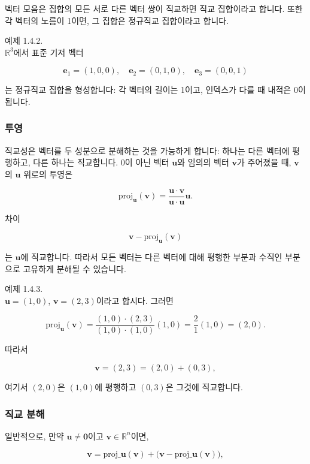 \documentclass[
  12pt,
  a4paper,
]{article}
\begin{document}
벡터 모음은 집합의 모든 서로 다른 벡터 쌍이 직교하면 직교 집합이라고 합니다. 또한 각 벡터의 노름이 1이면, 그 집합은 정규직교 집합이라고 합니다.

예제 1.4.2.\\
\(\mathbb{R}^3\)에서 표준 기저 벡터

\[\mathbf{e}_1 = (1,0,0), \quad \mathbf{e}_2 = (0,1,0), \quad \mathbf{e}_3 = (0,0,1)\]

는 정규직교 집합을 형성합니다: 각 벡터의 길이는 1이고, 인덱스가 다를 때 내적은 0이 됩니다.

\subsubsection{투영}\label{projections}

직교성은 벡터를 두 성분으로 분해하는 것을 가능하게 합니다: 하나는 다른 벡터에 평행하고, 다른 하나는 직교합니다. 0이 아닌 벡터 \(\mathbf{u}\)와 임의의 벡터 \(\mathbf{v}\)가 주어졌을 때, \(\mathbf{v}\)의 \(\mathbf{u}\) 위로의 투영은

\[\text{proj}_{\mathbf{u}}(\mathbf{v}) = \frac{\mathbf{u} \cdot \mathbf{v}}{\mathbf{u} \cdot \mathbf{u}} \mathbf{u}.\]

차이

\[\mathbf{v} - \text{proj}_{\mathbf{u}}(\mathbf{v})\]

는 \(\mathbf{u}\)에 직교합니다. 따라서 모든 벡터는 다른 벡터에 대해 평행한 부분과 수직인 부분으로 고유하게 분해될 수 있습니다.

예제 1.4.3.\\
\(\mathbf{u} = (1,0)\), \(\mathbf{v} = (2,3)\)이라고 합시다. 그러면

\[\text{proj}_{\mathbf{u}}(\mathbf{v}) = \frac{(1,0)\cdot(2,3)}{(1,0)\cdot(1,0)} (1,0)
= \frac{2}{1}(1,0) = (2,0).\]

따라서

\[\mathbf{v} = (2,3) = (2,0) + (0,3),\]

여기서 \((2,0)\)은 \((1,0)\)에 평행하고 \((0,3)\)은 그것에 직교합니다.

\subsubsection{직교 분해}\label{orthogonal-decomposition}

일반적으로, 만약 \(\mathbf{u} \neq \mathbf{0}\)이고 \(\mathbf{v} \in \mathbb{R}^n\)이면,

\[\mathbf{v} = \text{proj}\_{\mathbf{u}}(\mathbf{v}) + \big(\mathbf{v} - \text{proj}\_{\mathbf{u}}(\mathbf{v})\big),\]
\end{document}
